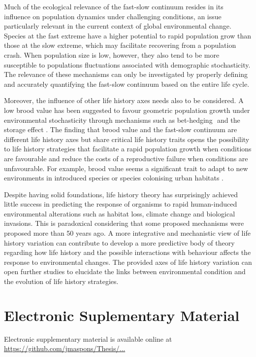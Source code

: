 Much of the ecological relevance of the fast-slow continuum resides in its 
influence on population dynamics under challenging conditions, an issue 
particularly relevant in the current context of global environmental change. 
Species at the fast extreme have a higher potential to rapid population grow 
than those at the slow extreme, which may facilitate recovering from a 
population crash. When population size is low, however, they also tend to be 
more susceptible to populations fluctuations associated with demographic 
stochasticity. The relevance of these mechanisms can only be investigated by 
properly defining and accurately quantifying the fast-slow continuum based on 
the entire life cycle. 

Moreover, the influence of other life history axes needs also to be considered. 
A low brood value has been suggested to favour geometric population growth under 
environmental stochasticity through mechanisms such as bet-hedging 
\citep{Stearns2000a}⁠ and the storage effect \citep{Cubaynes2011}. The finding
that brood value and the fast-slow continuum are different life history axes but
share critical life history traits opens the possibility to life history
strategies that facilitate a rapid population growth when conditions are
favourable and reduce the costs of a reproductive failure when conditions are
unfavourable. For example, brood value seems a significant trait to adapt to
new environments in introduced species or species colonising urban habitats
\citep{Sol2012a,Sol2014}.

Despite having solid foundations, life history theory has surprisingly achieved 
little success in predicting the response of organisms to rapid human-induced 
environmental alterations such as habitat loss, climate change and biological 
invasions. This is paradoxical considering that some proposed mechanisms were 
proposed more than 50 years ago. A more integrative and mechanistic view of life 
history variation can contribute to develop a more predictive body of theory 
regarding how life history and the possible interactions with behaviour
\citep{Ricklefs2002,Reale2010a,Sol2018,Maspons2019} affects the response to
environmental changes. The provided axes of life history variation can open
further studies to elucidate the links between environmental condition and the
evolution of life history strategies.

\section*{Electronic Suplementary Material}

Electronic supplementary material is available online at
\url{https://github.com/jmaspons/Thesis/...} %
